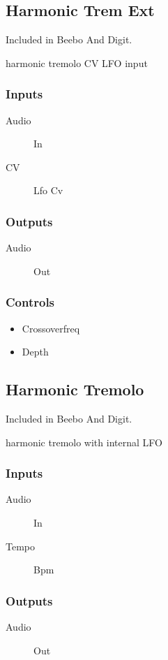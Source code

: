 \subsection{Harmonic Trem Ext}

Included in Beebo And Digit.

harmonic tremolo CV LFO input



\subsubsection{Inputs}
\begin{description}
\item [Audio] In
\item [CV] Lfo Cv
\end{description}

\subsubsection{Outputs}
\begin{description}
\item [Audio] Out
\end{description}

\subsubsection{Controls}
\begin{itemize}
\item Crossoverfreq
\item Depth
\end{itemize}

\subsection{Harmonic Tremolo}

Included in Beebo And Digit.

harmonic tremolo with internal LFO



\subsubsection{Inputs}
\begin{description}
\item [Audio] In
\item [Tempo] Bpm
\end{description}

\subsubsection{Outputs}
\begin{description}
\item [Audio] Out
\end{description}

